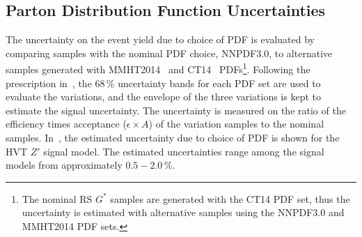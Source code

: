 \subsection{Parton Distribution Function Uncertainties}
The uncertainty on the event yield due to choice of PDF is evaluated by comparing samples with the nominal PDF choice, \textsc{NNPDF3.0}, to alternative samples generated with \textsc{MMHT2014}~\cite{mmht} and \textsc{CT14}~\cite{CT14} PDFs\footnote{
	The nominal RS $G^*$ samples are generated with the \textsc{CT14} PDF set, thus the uncertainty is estimated with alternative samples using the \textsc{NNPDF3.0} and \textsc{MMHT2014} PDF sets.
}. Following the prescription in~, the 68\,\% uncertainty bands for each PDF set are used to evaluate the variations, and the envelope of the three variations is kept to estimate the signal uncertainty. The uncertainty is measured on the ratio of the efficiency times acceptance ($\epsilon\times A$) of the variation samples to the nominal samples. In~\Fig{\ref{fig:pdf}}, the estimated uncertainty due to choice of PDF is shown for the HVT $Z'$ signal model. The estimated uncertainties range among the signal models from approximately $0.5-2.0\,\%$.

